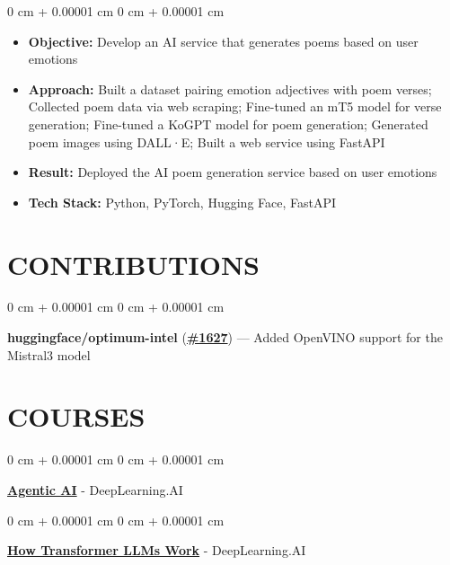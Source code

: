 \documentclass[10pt, letterpaper]{article}
\newenvironment{highlights}{
    \begin{itemize}[
        topsep=0.10 cm,
        parsep=0.10 cm,
        partopsep=0pt,
        itemsep=0pt,
        leftmargin=0 cm + 10pt
    ]
}{
    \end{itemize}
} %
\newenvironment{onecolentry}{
    \begin{adjustwidth}{
        0 cm + 0.00001 cm
    }{
        0 cm + 0.00001 cm
    }
}{
    \end{adjustwidth}
} %
\begin{document}
        \vspace{0.10 cm}
        \begin{onecolentry}
            \begin{highlights}
                \item \textbf{Objective:} Develop an AI service that generates poems based on user emotions
                \item \textbf{Approach:} Built a dataset pairing emotion adjectives with poem verses; Collected poem data via web scraping; Fine-tuned an mT5 model for verse generation; Fine-tuned a KoGPT model for poem generation; Generated poem images using DALL·E; Built a web service using FastAPI
                \item \textbf{Result:} Deployed the AI poem generation service based on user emotions
                \item \textbf{Tech Stack:} Python, PyTorch, Hugging Face, FastAPI
            \end{highlights}
        \end{onecolentry}

    \vspace{5 pt - 0.3 cm}
    \section{CONTRIBUTIONS}
        \begin{onecolentry}
            \textbf{huggingface/optimum-intel} (\href{https://github.com/huggingface/optimum-intel/pull/1627}{\textbf{\#1627}}) --- Added OpenVINO support for the Mistral3 model
        \end{onecolentry}

    \vspace{5 pt - 0.3 cm}
    \section{COURSES}
        \begin{onecolentry}
            \href{https://learn.deeplearning.ai/certificates/ce11af1e-7a25-4f02-a0dc-164c144570de?usp=sharing}{\textbf{Agentic AI}} - DeepLearning.AI
        \end{onecolentry}

        \vspace{0.10 cm}
        \begin{onecolentry}
            \href{https://learn.deeplearning.ai/accomplishments/e4b8ec62-0ff5-481d-9536-2c43a34fda89?usp=sharing}{\textbf{How Transformer LLMs Work}} - DeepLearning.AI
        \end{onecolentry}
        
\end{document}

